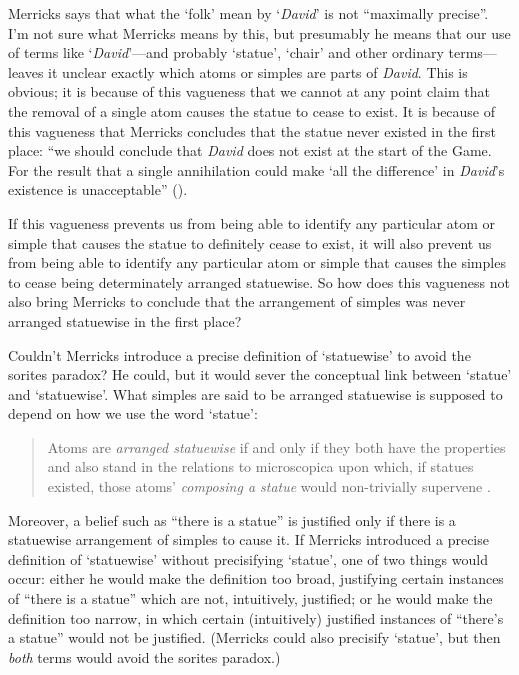 \documentclass[11pt]{article}
\newenvironment{squote}{%
	\begin{quote}\begin{singlespace}%
	}{%
	\end{singlespace}\end{quote}}
\begin{document}
\begin{spacing}{1.5}
Merricks says that what the `folk' mean by `{\em David}' is not
``maximally precise''.  I'm not sure what Merricks means by this, but
presumably he means that our use of terms like `{\em David}'---and
probably `statue', `chair' and other ordinary terms---leaves it
unclear exactly which atoms or simples are parts of {\em David}.  This
is obvious; it is because of this vagueness that we cannot at any
point claim that the removal of a single atom causes the statue to
cease to exist.  It is because of this vagueness that Merricks
concludes that the statue never existed in the first place: ``we
should conclude that {\em David} does not exist at the start of the
Game.  For the result that a single annihilation could make `all the
difference' in {\em David}'s existence is unacceptable''
(\citeyear[33]{merricks2001a}).  

If this vagueness prevents us from being able to identify any
particular atom or simple that causes the statue to definitely cease
to exist, it will also prevent us from being able to identify any
particular atom or simple that causes the simples to cease being
determinately arranged statuewise.  So how does this vagueness not
also bring Merricks to conclude that the arrangement of simples was
never arranged statuewise in the first place?

Couldn't Merricks introduce a precise definition of `statuewise' to
avoid the sorites paradox?  He could, but it would sever the
conceptual link between `statue' and `statuewise'.  What simples are
said to be arranged statuewise is supposed to depend on how we use the
word `statue':

\begin{squote}
Atoms are {\em arranged statuewise} if and only if they both have the
properties and also stand in the relations to microscopica upon which,
if statues existed, those atoms' {\em composing a statue} would
non-trivially supervene \citep[4]{merricks2001a}.
\end{squote}

Moreover, a belief such as ``there is a statue'' is justified only if
there is a statuewise arrangement of simples to cause it.  If Merricks
introduced a precise definition of `statuewise' without precisifying
`statue', one of two things would occur: either he would make the
definition too broad, justifying certain instances of ``there is a
statue'' which are not, intuitively, justified; or he would make the
definition too narrow, in which certain (intuitively) justified
instances of ``there's a statue'' would not be justified.  (Merricks
could also precisify `statue', but then {\em both} terms would avoid
the sorites paradox.)


\end{spacing}
\end{document}

